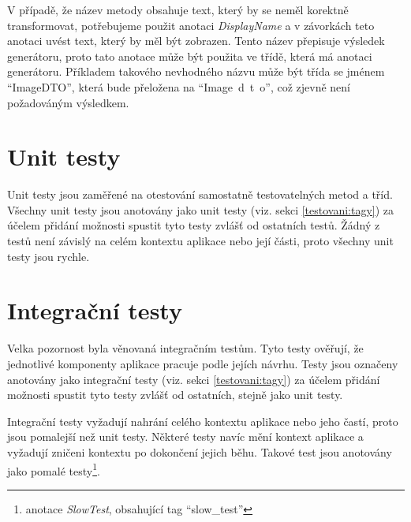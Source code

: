     V případě, že název metody obsahuje text, který by se neměl korektně transformovat, potřebujeme použit anotaci \textit{DisplayName} a v závorkách teto anotaci uvést text, který by měl být zobrazen. Tento název přepisuje výsledek generátoru, proto tato anotace může být použita ve třídě, která má anotaci generátoru. Příkladem takového nevhodného názvu může být třída se jménem \enquote{ImageDTO}, která bude přeložena na \enquote{Image~d~t~o}, což zjevně není požadováným výsledkem.
    
\section{Unit testy}\label{testovani:unit}
    Unit testy jsou zaměřené na otestování samostatně testovatelných metod a tříd. Všechny unit testy jsou anotovány jako unit testy (viz. sekci \ref{testovani:tagy}) za účelem přidání možnosti spustit tyto testy zvlášť od ostatních testů. Žádný z testů není závislý na celém kontextu aplikace nebo její části, proto všechny unit testy jsou rychle.
    
\section{Integrační testy}\label{testovani:intergacni}
    Velka pozornost byla věnovaná integračním testům. Tyto testy ověřují, že jednotlivé komponenty aplikace pracuje podle jejích návrhu. Testy jsou označeny anotovány jako integrační testy (viz. sekci \ref{testovani:tagy}) za účelem přidání možnosti spustit tyto testy zvlášť od ostatních, stejně jako unit testy. 
    
    Integrační testy vyžadují nahrání celého kontextu aplikace nebo jeho častí, proto jsou pomalejší než unit testy. Některé testy navíc mění kontext aplikace a vyžadují zničeni kontextu po dokončení jejich běhu. Takové test jsou anotovány jako pomalé testy\footnote{anotace \textit{SlowTest}, obsahující tag \enquote{slow\_test}}.
    
